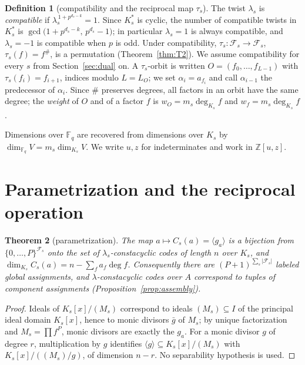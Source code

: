 \documentclass[10pt,journal,draftclsnofoot,onecolumn]{IEEEtran}
\newtheorem{theorem}{Theorem}[section]
\theoremstyle{definition}
\newtheorem{definition}[theorem]{Definition}
\theoremstyle{remark}
\newcommand{\Fq}{\mathbb{F}_q}
\newcommand{\Z}{\mathbb{Z}}
\begin{document}
\begin{definition}[compatibility and the reciprocal map \(\tau_s\)]
The twist \(\lambda_s\) is \emph{compatible} if
\(\lambda_s^{\,1 + p^{d_s - k}} = 1\). Since \(K_s^*\) is cyclic, the
number of compatible twists in \(K_s^*\) is
\(\gcd\big(1 + p^{d_s-k},\, p^{d_s} - 1\big)\); in particular
\(\lambda_s = 1\) is always compatible, and \(\lambda_s = -1\) is
compatible when \(p\) is odd.
Under compatibility, \(\tau_s : \mathcal{F}_s \to \mathcal{F}_s\),
\(\tau_s(f) = f^{\#}\), is a permutation (Theorem~\ref{thm:T2}). We
assume compatibility for every \(s\) from Section~\ref{sec:dual} on.
A \(\tau_s\)-orbit is written \(O = (f_0, \dots, f_{L-1})\) with
\(\tau_s(f_i) = f_{i+1}\), indices modulo \(L = L_O\); we set
\(\alpha_i = a_{f_i}\) and call \(\alpha_{i-1}\) the predecessor of
\(\alpha_i\). Since \(\#\) preserves degrees, all factors in an orbit
have the same degree; the \emph{weight} of \(O\) and of a factor \(f\) is
\(w_O = m_s \deg_{K_s} f\) and \(w_f = m_s \deg_{K_s} f\).
\end{definition}

Dimensions over \(\Fq\) are recovered from dimensions over \(K_s\) by
\(\dim_{\Fq} V = m_s \dim_{K_s} V\). We write \(u, z\) for indeterminates
and work in \(\Z[u,z]\).

\section{Parametrization and the reciprocal operation}\label{sec:param}

\begin{theorem}[parametrization]\label{thm:T1}
The map \(a \mapsto C_s(a) = \langle g_a \rangle\) is a bijection from
\(\{0,\dots,P\}^{\mathcal{F}_s}\) onto the set of \(\lambda_s\)-constacyclic
codes of length \(n\) over \(K_s\), and
\(\dim_{K_s} C_s(a) = n - \sum_{f} a_f \deg f\).
Consequently there are \((P+1)^{\sum_s |\mathcal{F}_s|}\) labeled global
assignments, and \(\lambda\)-constacyclic codes over \(A\) correspond to tuples
of component assignments (Proposition~\ref{prop:assembly}).
\end{theorem}

\begin{proof}
Ideals of \(K_s[x]/(M_s)\) correspond to ideals \((M_s) \subseteq I\) of
the principal ideal domain \(K_s[x]\), hence to monic divisors
\(\bar g\) of \(M_s\); by unique factorization and \(M_s =
\prod f^P\), monic divisors are exactly the \(g_a\). For a monic divisor
\(g\) of degree \(r\), multiplication by \(g\) identifies
\(\langle g \rangle \subseteq K_s[x]/(M_s)\) with
\(K_s[x]/((M_s)/g)\), of dimension \(n - r\). No separability hypothesis
is used.
\end{proof}
\end{document}
